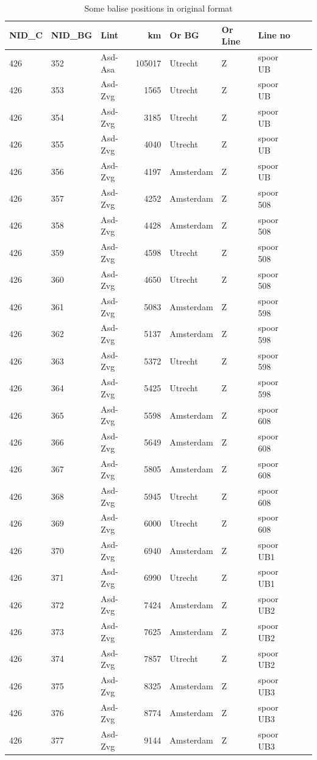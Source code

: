 \documentclass{template/openetcs_article}
\begin{document}
\begin{table}
  \centering
    \footnotesize\sffamily
\begin{tabular}{| l| l| l| r| l| l| l| l l}
\hline
\bf{NID\_C} & \bf{NID\_BG} & \bf{Lint} & \bf{km} & \bf{Or BG} & \bf{Or Line} & \bf{Line no} \\ 
\hline
426 & 352 & Asd-Asa & 105017 & Utrecht & Z & spoor UB \\
426 & 353 & Asd-Zvg & 1565 & Utrecht & Z & spoor UB \\
426 & 354 & Asd-Zvg & 3185 & Utrecht & Z & spoor UB \\
426 & 355 & Asd-Zvg & 4040 & Utrecht & Z & spoor UB \\
426 & 356 & Asd-Zvg & 4197 & Amsterdam & Z & spoor UB \\
426 & 357 & Asd-Zvg & 4252 & Amsterdam & Z & spoor 508 \\
426 & 358 & Asd-Zvg & 4428 & Amsterdam & Z & spoor 508 \\
426 & 359 & Asd-Zvg & 4598 & Utrecht & Z & spoor 508 \\
426 & 360 & Asd-Zvg & 4650 & Utrecht & Z & spoor 508 \\
426 & 361 & Asd-Zvg & 5083 & Amsterdam & Z & spoor 598 \\
426 & 362 & Asd-Zvg & 5137 & Amsterdam & Z & spoor 598 \\
426 & 363 & Asd-Zvg & 5372 & Utrecht & Z & spoor 598 \\
426 & 364 & Asd-Zvg & 5425 & Utrecht & Z & spoor 598 \\
426 & 365 & Asd-Zvg & 5598 & Amsterdam & Z & spoor 608 \\
426 & 366 & Asd-Zvg & 5649 & Amsterdam & Z & spoor 608 \\
426 & 367 & Asd-Zvg & 5805 & Amsterdam & Z & spoor 608 \\
426 & 368 & Asd-Zvg & 5945 & Utrecht & Z & spoor 608 \\
426 & 369 & Asd-Zvg & 6000 & Utrecht & Z & spoor 608 \\
426 & 370 & Asd-Zvg & 6940 & Amsterdam & Z & spoor UB1 \\
426 & 371 & Asd-Zvg & 6990 & Utrecht & Z & spoor UB1 \\
426 & 372 & Asd-Zvg & 7424 & Amsterdam & Z & spoor UB2 \\
426 & 373 & Asd-Zvg & 7625 & Amsterdam & Z & spoor UB2 \\
426 & 374 & Asd-Zvg & 7857 & Utrecht & Z & spoor UB2 \\
426 & 375 & Asd-Zvg & 8325 & Amsterdam & Z & spoor UB3 \\
426 & 376 & Asd-Zvg & 8774 & Amsterdam & Z & spoor UB3 \\
426 & 377 & Asd-Zvg & 9144 & Amsterdam & Z & spoor UB3 \\
\hline
\end{tabular}
\caption{Some balise positions in original format}
  \label{tab:balises}
\end{table}
\end{document}
